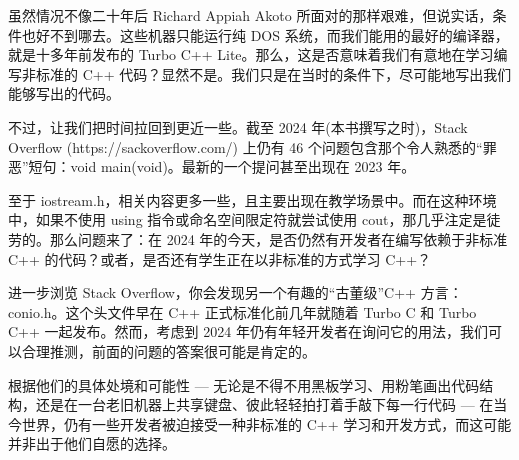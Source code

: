虽然情况不像二十年后 Richard Appiah Akoto 所面对的那样艰难，但说实话，条件也好不到哪去。这些机器只能运行纯 DOS 系统，而我们能用的最好的编译器，就是十多年前发布的 Turbo C++ Lite。那么，这是否意味着我们有意地在学习编写非标准的 C++ 代码？显然不是。我们只是在当时的条件下，尽可能地写出我们能够写出的代码。

不过，让我们把时间拉回到更近一些。截至 2024 年(本书撰写之时)，Stack Overflow (https://sackoverflow.com/) 上仍有 46 个问题包含那个令人熟悉的“罪恶”短句：void main(void)。最新的一个提问甚至出现在 2023 年。

至于 iostream.h，相关内容更多一些，且主要出现在教学场景中。而在这种环境中，如果不使用 using 指令或命名空间限定符就尝试使用 cout，那几乎注定是徒劳的。那么问题来了：在 2024 年的今天，是否仍然有开发者在编写依赖于非标准 C++ 的代码？或者，是否还有学生正在以非标准的方式学习 C++？

进一步浏览 Stack Overflow，你会发现另一个有趣的“古董级”C++ 方言：conio.h。这个头文件早在 C++ 正式标准化前几年就随着 Turbo C 和 Turbo C++ 一起发布。然而，考虑到 2024 年仍有年轻开发者在询问它的用法，我们可以合理推测，前面的问题的答案很可能是肯定的。

根据他们的具体处境和可能性 --- 无论是不得不用黑板学习、用粉笔画出代码结构，还是在一台老旧机器上共享键盘、彼此轻轻拍打着手敲下每一行代码 --- 在当今世界，仍有一些开发者被迫接受一种非标准的 C++ 学习和开发方式，而这可能并非出于他们自愿的选择。